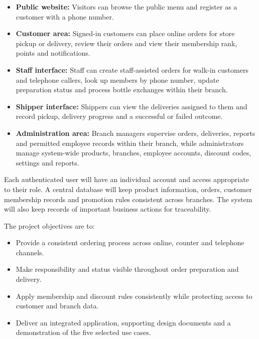 \begin{itemize}
  \item \textbf{Public website:} Visitors can browse the public menu and register as a customer with a phone number.
  \item \textbf{Customer area:} Signed-in customers can place online orders for store pickup or delivery, review their orders and view their membership rank, points and notifications.
  \item \textbf{Staff interface:} Staff can create staff-assisted orders for walk-in customers and telephone callers, look up members by phone number, update preparation status and process bottle exchanges within their branch.
  \item \textbf{Shipper interface:} Shippers can view the deliveries assigned to them and record pickup, delivery progress and a successful or failed outcome.
  \item \textbf{Administration area:} Branch managers supervise orders, deliveries, reports and permitted employee records within their branch, while administrators manage system-wide products, branches, employee accounts, discount codes, settings and reports.
\end{itemize}

Each authenticated user will have an individual account and access appropriate to their role. A central database will keep product information, orders, customer membership records and promotion rules consistent across branches. The system will also keep records of important business actions for traceability.

The project objectives are to:

\begin{itemize}
  \item Provide a consistent ordering process across online, counter and telephone channels.
  \item Make responsibility and status visible throughout order preparation and delivery.
  \item Apply membership and discount rules consistently while protecting access to customer and branch data.
  \item Deliver an integrated application, supporting design documents and a demonstration of the five selected use cases.
\end{itemize}
